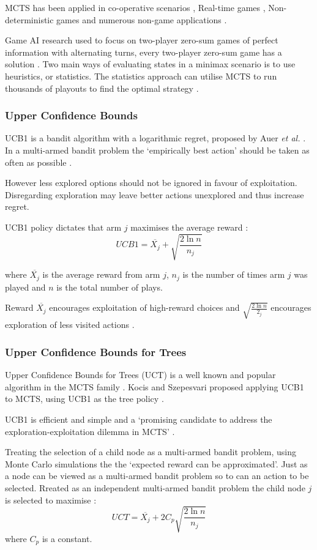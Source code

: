 MCTS has been applied in co-operative scenarios \cite{b5}, Real-time games \cite{b2}, Non-deterministic games \cite{b7} and numerous non-game applications \cite{b2}.

Game AI research used to focus on two-player zero-sum games of perfect information with alternating turns\cite{b2}, every two-player zero-sum game has a solution \cite{bartle}. Two main ways of evaluating states in a minimax scenario is to use heuristics, or statistics. The statistics approach can utilise MCTS to run thousands of playouts to find the optimal strategy \cite{bartle}.

\subsubsection{Upper Confidence Bounds}
UCB1 is a bandit algorithm with a logarithmic regret, proposed by Auer {\em et al.} \cite{ucb1}. In a multi-armed bandit problem the `empirically best action' should be taken as often as possible \cite{ucb1}. 

However less explored options should not be ignored in favour of exploitation. Disregarding exploration may leave better actions unexplored and thus increase regret. 

UCB1 policy dictates that arm $j$ maximises the average reward \cite{ucb1}:
\[UCB1 = \overline{X_{j}} + \sqrt{\frac{2 \ln n}{n_{j}}}\]

where $\overline{X_{j}}$ is the average reward from arm $j$, $n_{j}$ is the number of times arm $j$ was played and $n$ is the total number of plays.

Reward $\overline{X_{j}}$ encourages exploitation of high-reward choices \cite{ucb1} and $\sqrt{\frac{2 \ln n}{2_{j}}}$ encourages exploration of less visited actions \cite{b2}.

\subsubsection{Upper Confidence Bounds for Trees}
Upper Confidence Bounds for Trees (UCT) is a well known and popular algorithm in the MCTS family \cite{b2}. Kocis and Szepesvari \cite{kocsze} proposed applying UCB1 to MCTS, using UCB1 as the tree policy \cite{b2}.

UCB1 is efficient and simple \cite{b2} and a `promising candidate to address the exploration-exploitation dilemma in MCTS' \cite{b2}.

Treating the selection of a child node as a multi-armed bandit problem, using Monte Carlo simulations the the `expected reward can be approximated'. Just as a node can be viewed as a multi-armed bandit problem so to can an action to be selected. Rreated as an independent multi-armed bandit problem the child node $j$ is selected to maximise \cite{b2}:
\[UCT = \overline{X_{j}} +2C_{p}\sqrt{\frac{2 \ln n}{n_{j}}}\]
where $C_{p}$ is a constant.

